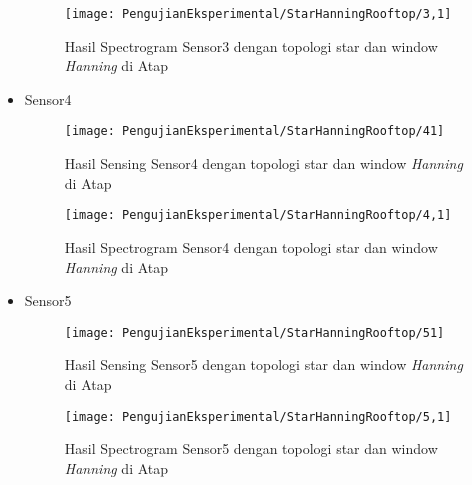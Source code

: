 \begin{itemize}
\begin{figure}[H]
	\centering
	\texttt{[image: PengujianEksperimental/StarHanningRooftop/3,1]}
	\caption[Hasil Spectrogram Sensor3 dengan topologi star dan window {\it Hanning} di Atap]{Hasil Spectrogram Sensor3 dengan topologi star dan window {\it Hanning} di Atap} 
	\label{fig:hasilAtapStarHann3,1}
\end{figure}

\item Sensor4
\begin{figure}[H]
	\centering
	\texttt{[image: PengujianEksperimental/StarHanningRooftop/41]}
	\caption[Hasil Sensing Sensor4 dengan topologi star dan window {\it Hanning} di Atap]{Hasil Sensing Sensor4 dengan topologi star dan window {\it Hanning} di Atap} 
	\label{fig:hasilAtapStarHann41}
\end{figure}

\begin{figure}[H]
	\centering
	\texttt{[image: PengujianEksperimental/StarHanningRooftop/4,1]}
	\caption[Hasil Spectrogram Sensor4 dengan topologi star dan window {\it Hanning} di Atap]{Hasil Spectrogram Sensor4 dengan topologi star dan window {\it Hanning} di Atap} 
	\label{fig:hasilAtapStarHann4,1}
\end{figure}

\item Sensor5
\begin{figure}[H]
	\centering
	\texttt{[image: PengujianEksperimental/StarHanningRooftop/51]}
	\caption[Hasil Sensing Sensor5 dengan topologi star dan window {\it Hanning} di Atap]{Hasil Sensing Sensor5 dengan topologi star dan window {\it Hanning} di Atap} 
	\label{fig:hasilAtapStarHann51}
\end{figure}

\begin{figure}[H]
	\centering
	\texttt{[image: PengujianEksperimental/StarHanningRooftop/5,1]}
	\caption[Hasil Spectrogram Sensor5 dengan topologi star dan window {\it Hanning} di Atap]{Hasil Spectrogram Sensor5 dengan topologi star dan window {\it Hanning} di Atap} 
	\label{fig:hasilAtapStarHann5,1}
\end{figure}
\end{itemize}

